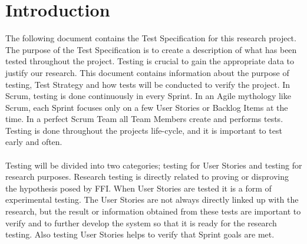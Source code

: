 \section{Introduction}
The following document contains the Test Specification for this research project. The purpose of the Test Specification is to create a description of what has been tested throughout the project. Testing is crucial to gain the appropriate data to justify our research. This document contains information about the purpose of testing, Test Strategy and how tests will be conducted to verify the project. In Scrum, testing is done continuously in every Sprint. In an Agile mythology like Scrum, each Sprint focuses only on a few User Stories or Backlog Items at the time. In a perfect Scrum Team all Team Members create and performs tests. Testing is done throughout the projects life-cycle, and it is important to test early and often.\\
\\
Testing will be divided into two categories; testing for User Stories and testing for research purposes. Research testing is directly related to proving or disproving the hypothesis posed by FFI. When User Stories are tested it is a form of experimental testing. The User Stories are not always directly linked up with the research, but the result or information obtained from these tests are important to verify and to further develop the system so that it is ready for the research testing. Also testing User Stories helps to verify that Sprint goals are met. \\
\\
\newpage